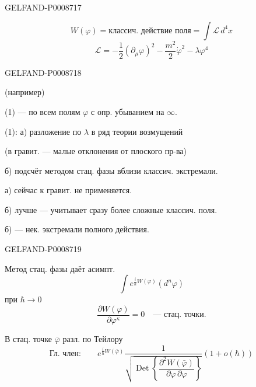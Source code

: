 \begin{GelfandAdjacentEvidence}{GELFAND-P000871}{7}


\begin{equation*}
W(\varphi)=\text{классич. действие поля}=\int\mathcal L\,d^4x
\tag{3}
\end{equation*}
\begin{equation*}
\mathcal L=-\frac12(\partial_\mu\varphi)^2-\frac{m^2}{2}\dot\varphi^2-\lambda\varphi^4
\tag{4}
\end{equation*}
\end{GelfandAdjacentEvidence}
\begin{GelfandAdjacentEvidence}{GELFAND-P000871}{8}


(например)

(1) --- по всем полям $\varphi$ с опр. убыванием на $\infty$.

 (1): а) разложение по $\lambda$ в ряд теории возмущений

(в гравит. --- малые отклонения от плоского пр-ва)

б) подсчёт методом стац. фазы вблизи классич. экстремали.

а) сейчас к гравит. не применяется.

б) лучше --- учитывает сразу более сложные классич. поля.

б) --- нек. экстремали полного действия.
\end{GelfandAdjacentEvidence}
\begin{GelfandAdjacentEvidence}{GELFAND-P000871}{9}


Метод стац. фазы даёт асимпт.
\begin{equation*}
\int e^{\frac{i}{\hbar}W(\varphi)}(d^n\varphi)
\tag{5}
\end{equation*}
при $\hbar\to0$
\begin{equation*}
\frac{\partial W(\varphi)}{\partial\varphi^\kappa}=0
\quad\text{--- стац. точки.}
\tag{6}
\end{equation*}
\end{GelfandAdjacentEvidence}


В стац. точке $\bar\varphi$ разл. по Тейлору
\begin{equation*}
\text{Гл. член:}\qquad
e^{\frac{i}{\hbar}W(\bar\varphi)}
\frac1{\sqrt{\operatorname{Det}\left\{\dfrac{\partial^2W(\bar\varphi)}{\partial\varphi\,\partial\varphi}\right\}}}
(1+o(\hbar))
\tag{7}
\end{equation*}


